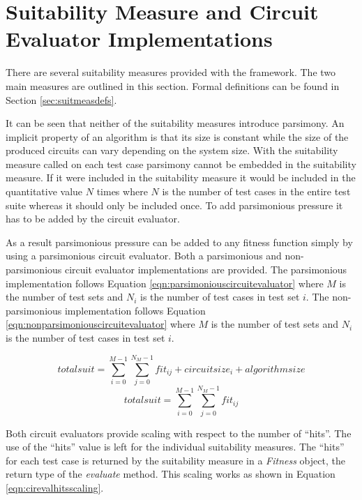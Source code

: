 \section{Suitability Measure and Circuit Evaluator Implementations}
\label{sec:provsuitmeas}

There are several suitability measures provided with the framework.
The two main measures are outlined in this section.
Formal definitions can be found in Section \ref{sec:suitmeasdefs}.

It can be seen that neither of the suitability measures introduce parsimony.
An implicit property of an algorithm is that its size is constant while the size of the produced circuits can vary depending on the system size.
With the suitability measure called on each test case parsimony cannot be embedded in the suitability measure.
If it were included in the suitability measure it would be included in the quantitative value $N$ times where $N$ is the number of test cases in the entire test suite whereas it should only be included once.
To add parsimonious pressure it has to be added by the circuit evaluator.

As a result parsimonious pressure can be added to any fitness function simply by using a parsimonious circuit evaluator.
Both a parsimonious and non-parsimonious circuit evaluator implementations are provided.
The parsimonious implementation follows Equation \ref{eqn:parsimoniouscircuitevaluator} where $M$ is the number of test sets and $N_i$ is the number of test cases in test set $i$.
The non-parsimonious implementation follows Equation \ref{eqn:nonparsimoniouscircuitevaluator} where $M$ is the number of test sets and $N_i$ is the number of test cases in test set $i$.

\begin{equation}
 totalsuit = \sum_{i=0}^{M-1}\sum_{j=0}^{N_M-1}fit_{ij}+circuitsize_i+algorithmsize
\label{eqn:parsimoniouscircuitevaluator}
\end{equation}
\begin{equation}
 totalsuit = \sum_{i=0}^{M-1}\sum_{j=0}^{N_M-1}fit_{ij}
\label{eqn:nonparsimoniouscircuitevaluator}
\end{equation}

Both circuit evaluators provide scaling with respect to the number of ``hits''.
The use of the ``hits'' value is left for the individual suitability measures.
The ``hits'' for each test case is returned by the suitability measure in a \emph{Fitness} object, the return type of the \emph{evaluate} method.
This scaling works as shown in Equation \ref{eqn:cirevalhitsscaling}.

